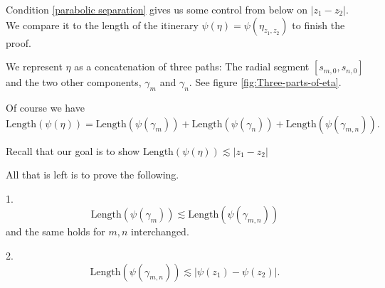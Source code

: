 Condition \ref{parabolic separation} gives us some control from below on $|z_1-z_2|$. We compare it to the length of the itinerary $\psi(\eta)=\psi(\eta_{z_1,z_2})$ to finish the proof.

 

We represent $\eta$ as a concatenation of three paths: The radial segment $[s_{m,0},s_{n,0}]$ and the two other components, $\gamma _m$ and $\gamma_n$. See figure \ref{fig:Three-parts-of-eta}.

Of course we have
\begin{equation}
	\mathrm{Length}(\psi(\eta))=\mathrm{Length}(\psi(\gamma_m))+\mathrm{Length}(\psi(\gamma_n))+\mathrm{Length}(\psi(\gamma_{m,n})).
\end{equation}

Recall that our goal is to show $\mathrm{Length}(\psi(\eta)) \lesssim |z_1-z_2|$

All that is left is to prove the following.
\begin{proposition}
1. \begin{equation}
	\mathrm{Length}(\psi(\gamma_m)) \lesssim \mathrm{Length}(\psi(\gamma_{m,n}))
\end{equation}
and the same holds for $m,n$ interchanged.

2. \begin{equation}
\mathrm{Length}(\psi(\gamma_{m,n})) \lesssim |\psi(z_1)-\psi(z_2)|.
\end{equation}

\end{proposition}

